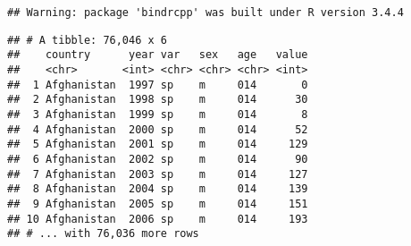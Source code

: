 \documentclass[]{article}
\newenvironment{Shaded}{\begin{snugshade}}{\end{snugshade}}
\newcommand{\KeywordTok}[1]{\textcolor[rgb]{0.13,0.29,0.53}{\textbf{#1}}}
\newcommand{\DataTypeTok}[1]{\textcolor[rgb]{0.13,0.29,0.53}{#1}}
\newcommand{\DecValTok}[1]{\textcolor[rgb]{0.00,0.00,0.81}{#1}}
\newcommand{\StringTok}[1]{\textcolor[rgb]{0.31,0.60,0.02}{#1}}
\newcommand{\OtherTok}[1]{\textcolor[rgb]{0.56,0.35,0.01}{#1}}
\newcommand{\OperatorTok}[1]{\textcolor[rgb]{0.81,0.36,0.00}{\textbf{#1}}}
\newcommand{\NormalTok}[1]{#1}
\begin{document}
\begin{Shaded}
\end{Shaded}

\begin{verbatim}
## Warning: package 'bindrcpp' was built under R version 3.4.4
\end{verbatim}

\begin{verbatim}
## # A tibble: 76,046 x 6
##    country      year var   sex   age   value
##    <chr>       <int> <chr> <chr> <chr> <int>
##  1 Afghanistan  1997 sp    m     014       0
##  2 Afghanistan  1998 sp    m     014      30
##  3 Afghanistan  1999 sp    m     014       8
##  4 Afghanistan  2000 sp    m     014      52
##  5 Afghanistan  2001 sp    m     014     129
##  6 Afghanistan  2002 sp    m     014      90
##  7 Afghanistan  2003 sp    m     014     127
##  8 Afghanistan  2004 sp    m     014     139
##  9 Afghanistan  2005 sp    m     014     151
## 10 Afghanistan  2006 sp    m     014     193
## # ... with 76,036 more rows
\end{verbatim}

\begin{Shaded}
\end{Shaded}
\end{document}
